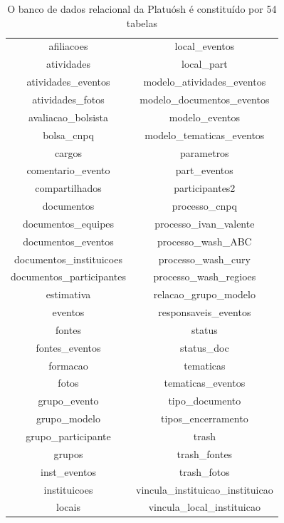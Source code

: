 \documentclass[
12pt,		%
openright,	%
twoside,  %
a4paper,			%
chapter=TITLE,		%
english,			%
french,				%
spanish,			%
brazil				%
]{USPSC-classe/USPSC}
\begin{document}
\begin{table}[htb]
\tiny
\caption{\label{5b2e4ba8f3836249e7dd88b37344da7bfa3669c5}O banco de dados relacional da Platu\'osh \'e constitu\'{i}do por 54 tabelas}

\centering
\begin{tabular}{|c|c|}
\hline
afiliacoes                     &   local\_eventos \\
 atividades                     &   local\_part \\
 atividades\_eventos             &   modelo\_atividades\_eventos \\
 atividades\_fotos               &   modelo\_documentos\_eventos \\
 avaliacao\_bolsista             &   modelo\_eventos \\
 bolsa\_cnpq                     &   modelo\_tematicas\_eventos \\
 cargos                         &   parametros \\
 comentario\_evento              &   part\_eventos \\
 compartilhados                 &   participantes2 \\
 documentos                     &   processo\_cnpq \\
 documentos\_equipes             &   processo\_ivan\_valente \\
 documentos\_eventos             &   processo\_wash\_ABC \\
 documentos\_instituicoes        &   processo\_wash\_cury \\
 documentos\_participantes       &   processo\_wash\_regioes \\
 estimativa                     &   relacao\_grupo\_modelo \\
 eventos                        &   responsaveis\_eventos \\
 fontes                         &   status \\
 fontes\_eventos                 &   status\_doc \\
 formacao                       &   tematicas \\
 fotos                          &   tematicas\_eventos \\
 grupo\_evento                   &   tipo\_documento \\
 grupo\_modelo                   &   tipos\_encerramento \\
 grupo\_participante             &   trash \\
 grupos                         &   trash\_fontes \\
 inst\_eventos                   &   trash\_fotos \\
 instituicoes                   &   vincula\_instituicao\_instituicao \\
 locais                         &   vincula\_local\_instituicao \\
\hline
\end{tabular}
\end{table}
\end{document}
